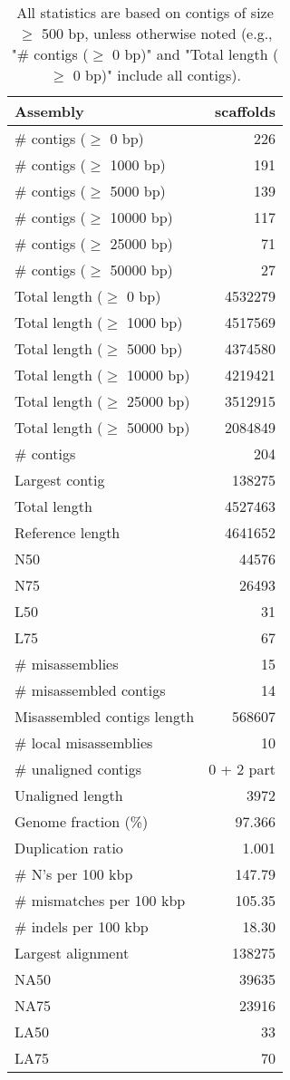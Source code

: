 \documentclass[12pt,a4paper]{article}
\begin{document}
\begin{table}[ht]
\begin{center}
\caption{All statistics are based on contigs of size $\geq$ 500 bp, unless otherwise noted (e.g., "\# contigs ($\geq$ 0 bp)" and "Total length ($\geq$ 0 bp)" include all contigs).}
\begin{tabular}{|l*{1}{|r}|}
\hline
Assembly & scaffolds \\ \hline
\# contigs ($\geq$ 0 bp) & 226 \\ \hline
\# contigs ($\geq$ 1000 bp) & 191 \\ \hline
\# contigs ($\geq$ 5000 bp) & 139 \\ \hline
\# contigs ($\geq$ 10000 bp) & 117 \\ \hline
\# contigs ($\geq$ 25000 bp) & 71 \\ \hline
\# contigs ($\geq$ 50000 bp) & 27 \\ \hline
Total length ($\geq$ 0 bp) & 4532279 \\ \hline
Total length ($\geq$ 1000 bp) & 4517569 \\ \hline
Total length ($\geq$ 5000 bp) & 4374580 \\ \hline
Total length ($\geq$ 10000 bp) & 4219421 \\ \hline
Total length ($\geq$ 25000 bp) & 3512915 \\ \hline
Total length ($\geq$ 50000 bp) & 2084849 \\ \hline
\# contigs & 204 \\ \hline
Largest contig & 138275 \\ \hline
Total length & 4527463 \\ \hline
Reference length & 4641652 \\ \hline
N50 & 44576 \\ \hline
N75 & 26493 \\ \hline
L50 & 31 \\ \hline
L75 & 67 \\ \hline
\# misassemblies & 15 \\ \hline
\# misassembled contigs & 14 \\ \hline
Misassembled contigs length & 568607 \\ \hline
\# local misassemblies & 10 \\ \hline
\# unaligned contigs & 0 + 2 part \\ \hline
Unaligned length & 3972 \\ \hline
Genome fraction (\%) & 97.366 \\ \hline
Duplication ratio & 1.001 \\ \hline
\# N's per 100 kbp & 147.79 \\ \hline
\# mismatches per 100 kbp & 105.35 \\ \hline
\# indels per 100 kbp & 18.30 \\ \hline
Largest alignment & 138275 \\ \hline
NA50 & 39635 \\ \hline
NA75 & 23916 \\ \hline
LA50 & 33 \\ \hline
LA75 & 70 \\ \hline
\end{tabular}
\end{center}
\end{table}
\end{document}
